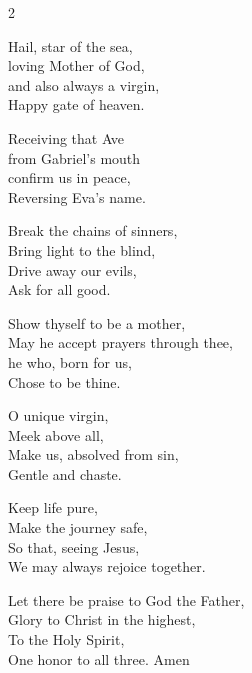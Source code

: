 \begin{multicols}{2}
\raggedcolumns
\begin{enpars}
Hail, star of the sea,\\
loving Mother of God,\\
and also always a virgin,\\
Happy gate of heaven.

Receiving that Ave\\
from Gabriel's mouth\\
confirm us in peace,\\
Reversing Eva's name.

Break the chains of sinners,\\
Bring light to the blind,\\
Drive away our evils,\\
Ask for all good.

Show thyself to be a mother,\\
May he accept prayers through thee,\\
he who, born for us,\\
Chose to be thine.

O unique virgin,\\
Meek above all,\\
Make us, absolved from sin,\\
Gentle and chaste.

Keep life pure,\\
Make the journey safe,\\
So that, seeing Jesus,\\
We may always rejoice together.

Let there be praise to God the Father,\\
Glory to Christ in the highest,\\
To the Holy Spirit,\\
One honor to all three. Amen
\end{enpars}
\end{multicols}